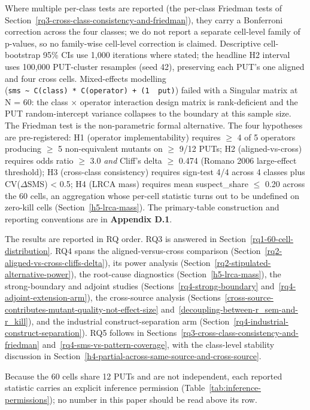 \documentclass[review,12pt,authoryear]{elsarticle}
\begin{document}
Where multiple per-class tests are reported (the per-class Friedman tests
of Section~\ref{rq3-cross-class-consistency-and-friedman}), they carry a Bonferroni correction across the four classes; we
do not report a separate cell-level family of p-values, so no family-wise
cell-level correction is claimed. Descriptive cell-bootstrap 95\% CIs
use 1,000 iterations where stated; the headline H2 interval uses
100,000 PUT-cluster resamples (seed 42), preserving each PUT's one
aligned and four cross cells. Mixed-effects
modelling
(\texttt{sms\ \textasciitilde{}\ C(class)\ *\ C(operator)\ +\ (1\ \textbar{}\ put)})
failed with a Singular matrix at N = 60: the class $\times$ operator
interaction design matrix is rank-deficient and the PUT random-intercept
variance collapses to the boundary at this sample size. The Friedman test
is the non-parametric formal alternative. The four hypotheses are
pre-registered: H1 (operator implementability) requires $\geq$ 4 of 5
operators producing $\geq$ 5 non-equivalent mutants on $\geq$ 9/12 PUTs; H2
(aligned-vs-cross) requires odds ratio $\geq$ 3.0 \emph{and} Cliff's delta $\geq$
0.474 (Romano 2006 large-effect threshold); H3 (cross-class consistency)
requires sign-test 4/4 across 4 classes plus CV($\Delta$SMS) \textless{} 0.5;
H4 (LRCA mass) requires mean suspect\_share $\leq$ 0.20 across the 60
cells, an aggregation whose per-cell statistic turns out to be undefined
on zero-kill cells (Section~\ref{h5-lrca-mass}). The primary-table
construction and reporting conventions are in
\textbf{Appendix D.1}.

The results are reported in RQ order. RQ3 is answered in
Section~\ref{rq1-60-cell-distribution}. RQ4 spans the aligned-versus-cross
comparison (Section~\ref{rq2-aligned-vs-cross-cliffs-delta}), its power
analysis (Section~\ref{rq2-stipulated-alternative-power}), the root-cause
diagnostics (Section~\ref{h5-lrca-mass}), the strong-boundary and adjoint
studies (Sections~\ref{rq4-strong-boundary} and~\ref{rq4-adjoint-extension-arm}),
the cross-source analysis
(Sections~\ref{cross-source-contributes-mutant-quality-not-effect-size}
and~\ref{decoupling-between-r_sem-and-r_kill}), and the industrial
construct-separation arm
(Section~\ref{rq4-industrial-construct-separation}). RQ5 follows in
Sections~\ref{rq3-cross-class-consistency-and-friedman}
and~\ref{rq4-sms-vs-pattern-coverage}, with the class-level stability
discussion in Section~\ref{h4-partial-across-same-source-and-cross-source}.

Because the 60 cells share 12 PUTs and are not independent, each
reported statistic carries an explicit inference permission
(Table~\ref{tab:inference-permissions}); no number in this paper should
be read above its row.
\end{document}
